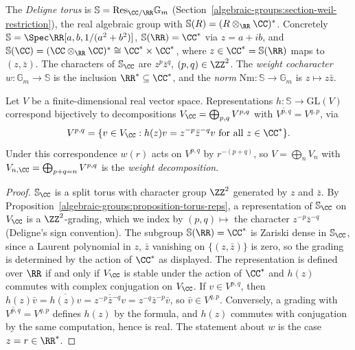 \begin{definition}\label{algebraic-groups:definition-deligne-torus}
The \emph{Deligne torus} is $\mathbb{S} = \mathrm{Res}_{\CC/\RR}\mathbb{G}_m$ (Section~\ref{algebraic-groups:section-weil-restriction}), the real algebraic group with
$\mathbb{S}(R) = (R \otimes_\RR\CC)^*$. Concretely $\mathbb{S} = \Spec\RR[a, b, 1/(a^2 + b^2)]$, $\mathbb{S}(\RR) = \CC^*$ via $z = a + ib$, and
$\mathbb{S}(\CC) = (\CC \otimes_\RR\CC)^* \cong \CC^* \times \CC^*$, where $z \in \CC^* = \mathbb{S}(\RR)$ maps to $(z, \bar z)$. The characters of $\mathbb{S}_\CC$ are
$z^p\bar z^q$, $(p, q) \in \ZZ^2$. The \emph{weight cocharacter} $w \colon \mathbb{G}_m \to \mathbb{S}$ is the inclusion $\RR^* \subseteq \CC^*$, and the \emph{norm}
$\mathrm{Nm} \colon \mathbb{S} \to \mathbb{G}_m$ is $z \mapsto z\bar z$.
\end{definition}

\begin{proposition}\label{algebraic-groups:proposition-deligne-torus}
Let $V$ be a finite-dimensional real vector space. Representations $h \colon \mathbb{S} \to \mathrm{GL}(V)$ correspond bijectively to decompositions
$V_\CC = \bigoplus_{p,q}V^{p,q}$ with $\overline{V^{p,q}} = V^{q,p}$, via
\[
V^{p,q} = \{v \in V_\CC : h(z)v = z^{-p}\bar z^{-q}v \text{ for all } z \in \CC^*\}.
\]
Under this correspondence $w(r)$ acts on $V^{p,q}$ by $r^{-(p+q)}$, so $V = \bigoplus_nV_n$ with $V_{n,\CC} = \bigoplus_{p+q=n}V^{p,q}$ is the \emph{weight decomposition}.
\end{proposition}

\begin{proof}
$\mathbb{S}_\CC$ is a split torus with character group $\ZZ^2$ generated by $z$ and $\bar z$. By Proposition~\ref{algebraic-groups:proposition-torus-reps}, a representation of $\mathbb{S}_\CC$ on
$V_\CC$ is a $\ZZ^2$-grading, which we index by $(p, q) \mapsto$ the character $z^{-p}\bar z^{-q}$ (Deligne's sign convention). The subgroup $\mathbb{S}(\RR) = \CC^*$ is Zariski dense in
$\mathbb{S}_\CC$, since a Laurent polynomial in $z$, $\bar z$ vanishing on $\{(z, \bar z)\}$ is zero, so the grading is determined by the action of $\CC^*$ as displayed. The
representation is defined over $\RR$ if and only if $V_\CC$ is stable under the action of $\CC^*$ and $h(z)$ commutes with complex conjugation on $V_\CC$. If $v \in V^{p,q}$, then
$h(z)\bar v = \overline{h(z)v} = \overline{z^{-p}\bar z^{-q}v} = z^{-q}\bar z^{-p}\bar v$, so $\bar v \in V^{q,p}$. Conversely, a grading with $\overline{V^{p,q}} = V^{q,p}$ defines $h(z)$
by the formula, and $h(z)$ commutes with conjugation by the same computation, hence is real. The statement about $w$ is the case $z = r \in \RR^*$.
\end{proof}

